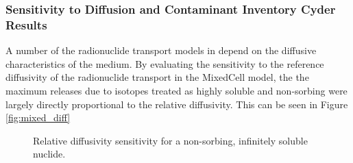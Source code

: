 
\subsubsection{Sensitivity to Diffusion and Contaminant Inventory Cyder Results}
A number of the radionuclide transport models in \Cyder depend on the diffusive 
characteristics of the medium. By evaluating the sensitivity to the reference 
diffusivity of the radionuclide transport in the MixedCell model, the 
the maximum releases due to isotopes treated as highly soluble and non-sorbing
were largely directly proportional to the relative diffusivity. 
This can be seen in Figure \ref{fig:mixed_diff} 
\begin{figure}[ht]
\centering
\caption{Relative diffusivity sensitivity for a non-sorbing, infinitely soluble 
nuclide.}
\label{fig:DCInvI129}
\end{figure}
